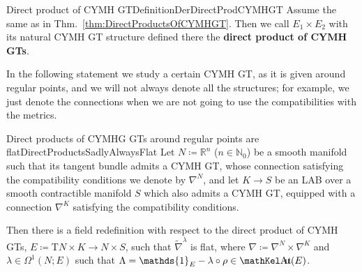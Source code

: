 \begin{definitions}{Direct product of CYMH GT}{DefinitionDerDirectProdCYMHGT}
Assume the same as in Thm.~\ref{thm:DirectProductsOfCYMHGT}. Then we call $E_1\times E_2$ with its natural CYMH GT structure defined there the \textbf{direct product of CYMH GTs}.
\end{definitions}

In the following statement we study a certain CYMH GT, as it is given around regular points, and we will not always denote all the structures; for example, we just denote the connections when we are not going to use the compatibilities with the metrics.

\begin{theorems}{Direct products of CYMHG GTs around regular points are flat}{DirectProductsSadlyAlwaysFlat}
Let $N \coloneqq \mathbb{R}^n$ ($n \in \mathbb{N}_0$) be a smooth manifold such that its tangent bundle admits a CYMH GT, whose connection satisfying the compatibility conditions we denote by $\nabla^{N}$, and let $K \to S$ be an LAB over a smooth contractible manifold $S$ which also admits a CYMH GT, equipped with a connection $\nabla^K$ satisfying the compatibility conditions.

Then there is a field redefinition with respect to the direct product of CYMH GTs, $E \coloneqq \mathrm{T}N \times K \to N \times S$, such that $\widetilde{\nabla}^\lambda$ is flat, where $\nabla \coloneqq \nabla^{N} \times \nabla^K$ and $\lambda \in \Omega^1(N;E)$ such that $\Lambda = \mathds{1}_E - \lambda \circ \rho \in \sAut(E)$.
\end{theorems}

